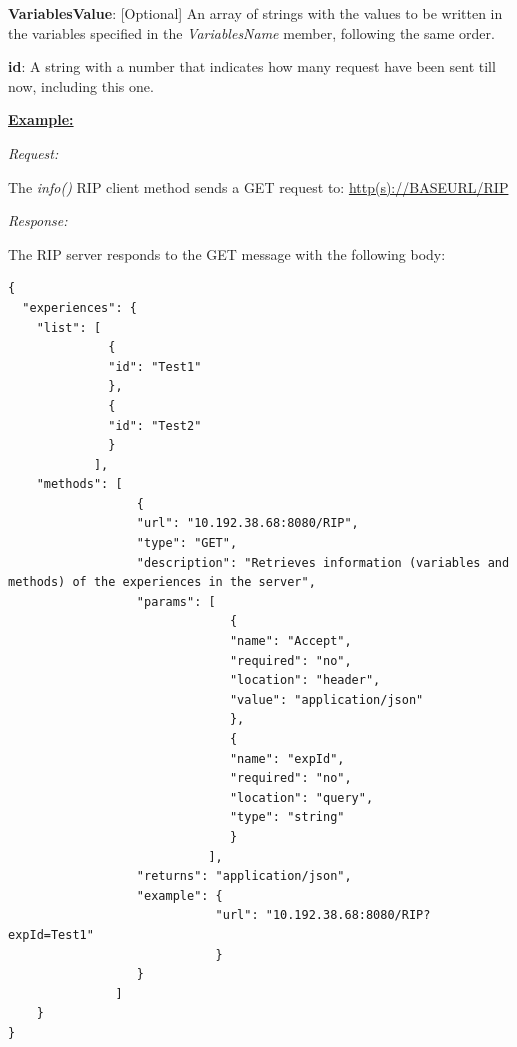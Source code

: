 \begin{myEnumerate}
\begin{myEnumerate}
\begin{myEnumerate}
\begin{myEnumerate}
\begin{myEnumerate}
\begin{myEnumerate}
                            \item \textbf{VariablesValue}: [Optional] An array of strings with the values to be written in the variables specified in the \textit{VariablesName} member, following the same order.
                        \end{myEnumerate}
                        \item \textbf{id}: A string with a number that indicates how many request have been sent till now, including this one.
                    \end{myEnumerate}
            \end{myEnumerate}
        \end{myEnumerate}
    \end{myEnumerate}
\end{myEnumerate}

\textbf{\underline{Example:}}

\textit{Request:}

The \textit{info()} RIP client method sends a GET request to: \url{http(s)://BASEURL/RIP}

\textit{Response:}

The RIP server responds to the GET message with the following body:

\begin{lstlisting}
{
  "experiences": {
    "list": [
              {
              "id": "Test1"
              },
              {
              "id": "Test2"
              }
            ],
    "methods": [
                  {
                  "url": "10.192.38.68:8080/RIP",
                  "type": "GET",
                  "description": "Retrieves information (variables and methods) of the experiences in the server",
                  "params": [
                               {
                               "name": "Accept",
                               "required": "no",
                               "location": "header",
                               "value": "application/json"
                               },
                               {
                               "name": "expId",
                               "required": "no",
                               "location": "query",
                               "type": "string" 
                               }
                            ],
                  "returns": "application/json",
                  "example": {
                             "url": "10.192.38.68:8080/RIP?expId=Test1"
                             }
                  }
               ]
    }
}
\end{lstlisting}

